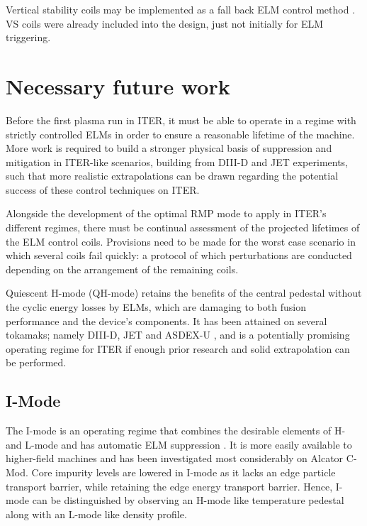 \documentclass[12pt]{article}  %
\begin{document}
Vertical stability coils may be implemented as a fall back ELM control method \cite{Loarte2014a}. VS coils were already included into the design, just not initially for ELM triggering.

\section{Necessary future work}\label{sec:Future}
Before the first plasma run in ITER, it must be able to operate in a regime with strictly controlled ELMs in order to ensure a reasonable lifetime of the machine. More work is required to build a stronger physical basis of suppression and mitigation in ITER-like scenarios, building from DIII-D \cite{Evans2008,Lanctot2013} and JET \cite{Liang2013} experiments, such that more realistic extrapolations can be drawn regarding the potential success of these control techniques on ITER.

Alongside the development of the optimal RMP mode to apply in ITER's different regimes, there must be continual assessment of the projected lifetimes of the ELM control coils. Provisions need to be made for the worst case scenario in which several coils fail quickly: a protocol of which perturbations are conducted depending on the arrangement of the remaining coils. 

Quiescent H-mode (QH-mode) retains the benefits of the central pedestal without the cyclic energy losses by ELMs, which are damaging to both fusion performance and the device's components. It has been attained on several tokamaks; namely DIII-D, JET and ASDEX-U \cite{Burrell2002, Suttrop2005}, and is a potentially promising operating regime for ITER if enough prior research and solid extrapolation can be performed.


\subsection{I-Mode}
The I-mode is an operating regime that combines the desirable elements of H- and L-mode \cite{Whyte2010} and has automatic ELM suppression \cite{Marmar2015}. It is more easily available to higher-field machines and has been investigated most considerably on Alcator C-Mod. Core impurity levels are lowered in I-mode as it lacks an edge particle transport barrier, while retaining the edge energy transport barrier. Hence, I-mode can be distinguished by observing an H-mode like temperature pedestal along with an L-mode like density profile.\cite{Whyte2010}




\printbibliography
\end{document}
